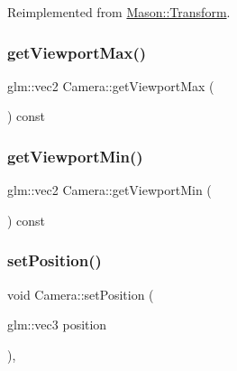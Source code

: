 Reimplemented from \hyperlink{class_mason_1_1_transform_afb5f0dbe6bcd49e26a792f578bf5ec9d}{Mason\+::\+Transform}.

\hypertarget{class_mason_1_1_camera_abe43550148e85f5a32919a3c8b8ff115}{}\label{class_mason_1_1_camera_abe43550148e85f5a32919a3c8b8ff115} 
\subsubsection{\texorpdfstring{get\+Viewport\+Max()}{getViewportMax()}}
{\footnotesize\ttfamily glm\+::vec2 Camera\+::get\+Viewport\+Max (\begin{DoxyParamCaption}{ }\end{DoxyParamCaption}) const}

\hypertarget{class_mason_1_1_camera_a0d2d26d8b7b80ab508ed4f4f537614b5}{}\label{class_mason_1_1_camera_a0d2d26d8b7b80ab508ed4f4f537614b5} 
\subsubsection{\texorpdfstring{get\+Viewport\+Min()}{getViewportMin()}}
{\footnotesize\ttfamily glm\+::vec2 Camera\+::get\+Viewport\+Min (\begin{DoxyParamCaption}{ }\end{DoxyParamCaption}) const}

\hypertarget{class_mason_1_1_camera_a69f184af46d081b85209040bbe814cbb}{}\label{class_mason_1_1_camera_a69f184af46d081b85209040bbe814cbb} 
\subsubsection{\texorpdfstring{set\+Position()}{setPosition()}}
{\footnotesize\ttfamily void Camera\+::set\+Position (\begin{DoxyParamCaption}\item[{glm\+::vec3}]{position }\end{DoxyParamCaption})\hspace{0.3cm}{\ttfamily [override]}, {\ttfamily [virtual]}}



